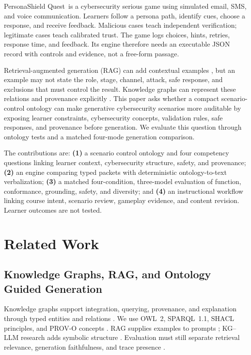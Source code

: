\documentclass[runningheads]{llncs}
\newcommand{\psq}{PersonaShield Quest}
\begin{document}
\psq\ is a cybersecurity serious game using simulated email, SMS, and voice
communication. Learners follow a persona path, identify cues, choose a response,
and receive feedback. Malicious cases teach independent verification; legitimate
cases teach calibrated trust. The game logs choices, hints, retries, response
time, and feedback. Its engine therefore needs an executable JSON record with
controls and evidence, not a free-form passage.

Retrieval-augmented generation (RAG) can add contextual examples
\cite{lewis2020}, but an example may not state the role, stage, channel, attack,
safe response, and exclusions that must control the result. Knowledge graphs can
represent these relations and provenance explicitly \cite{hogan2021,pan2024}.
This paper asks whether a compact scenario-control ontology can make generative cybersecurity scenarios more auditable by exposing learner constraints, cybersecurity concepts, validation rules, safe responses, and provenance before generation. We evaluate this question through ontology tests and a matched four-mode generation comparison. %

The contributions are: \textbf{(1)} a scenario control ontology and four competency
questions linking learner context, cybersecurity structure, safety, and
provenance; \textbf{(2)} an engine comparing typed packets with deterministic
ontology-to-text verbalization; \textbf{(3)} a matched four-condition, three-model
evaluation of function, conformance, grounding, safety, and diversity; and \textbf{(4)} an
instructional workflow linking course intent, scenario review, gameplay evidence,
and content revision. Learner outcomes are not tested.

\section{Related Work}

\subsection{Knowledge Graphs, RAG, and Ontology Guided Generation}

Knowledge graphs support integration, querying, provenance, and explanation
through typed entities and relations \cite{hogan2021}. We use OWL~2, SPARQL~1.1,
SHACL principles, and PROV-O concepts \cite{owl2,provo,sparql,shacl}. RAG supplies
examples to prompts \cite{lewis2020}; KG--LLM research adds symbolic structure
\cite{pan2024}. Evaluation must still separate retrieval relevance, generation
faithfulness, and trace presence \cite{es2024ragas}.
\end{document}
